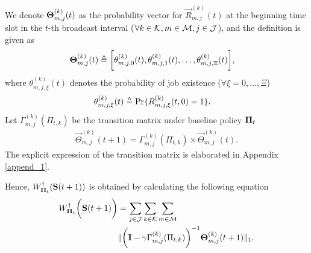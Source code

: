 \begin{lemma}
    We denote $\boldsymbol{\Theta}^{(k)}_{m,j}(t)$ as the probability vector for $\vec{R}_{m,j}^{(k)}(t)$ at the beginning time slot in the $t$-th broadcast interval ($\forall k\in\mathcal{K}, m\in\mathcal{M}, j\in\mathcal{J}$), and the definition is given as
    \begin{align}
        \boldsymbol{\Theta}^{(k)}_{m,j}(t) &\triangleq
        \bigg[ \theta^{(k)}_{m,j,0}(t), \theta^{(k)}_{m,j,1}(t), \dots, \theta^{(k)}_{m,j,\Xi}(t) \bigg],
    \end{align}
    where $\theta^{(k)}_{m,j,\xi}(t)$ denotes the probability of job existence ($\forall \xi=0,\dots,\Xi$)
    \begin{align}
        \theta^{(k)}_{m,j,\xi}(t) &\triangleq \Pr\{R^{(k)}_{m,j,\xi}(t,0) = 1\}.
    \end{align}
    Let ${\Gamma}^{(k)}_{m,j}(\Pi_{t,k})$ be the transition matrix under baseline policy $\boldsymbol{\Pi}_{t}$
    \begin{align}
        \vec{\Theta}_{m,j}^{(k)}(t+1) = {\Gamma}^{(k)}_{m,j}(\Pi_{t,k}) \times \vec{\Theta}_{m,j}^{(k)}(t).
    \end{align}
    The explicit expression of the transition matrix is elaborated in Appendix \ref{append_1}.

    Hence, $W^{\dagger}_{\boldsymbol{\Pi}_{t}}(\mathbf{S}(t+1))$ is obtained by calculating the following equation
    \begin{align}
        W^{\dagger}_{\boldsymbol{\Pi}_{t}}\bigg(\mathbf{S}(t+1)\bigg) &= \sum_{j\in\mathcal{J}}\sum_{k\in\mathcal{K}}\sum_{m\in\mathcal{M}}
        \nonumber\\
        &\lVert
            \bigg( \mathbf{I} - \gamma {\Gamma}^{(k)}_{m,j}(\Pi_{t,k}) \bigg)^{-1} \boldsymbol{\Theta}^{(k)}_{m,j}(t+1)
        \|_1.
        \label{w_ap}
    \end{align}
\end{lemma}

